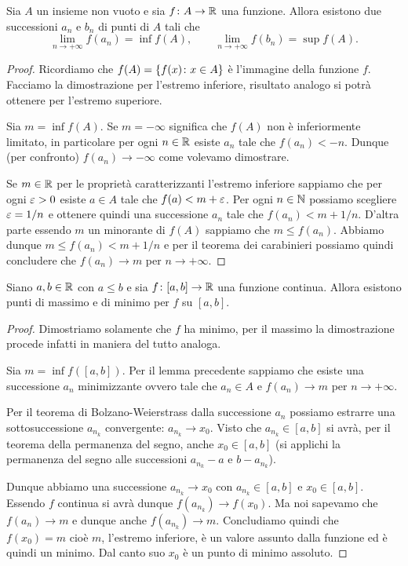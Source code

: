 \begin{lemma}
Sia $A$ un insieme non vuoto e
sia $f\colon A \to \mathbb R$ una funzione. Allora esistono
due successioni $a_n$ e $b_n$ di punti di $A$ tali che
\[
  \lim_{n\to +\infty} f(a_n) = \inf f(A), \qquad
  \lim_{n\to +\infty} f(b_n) = \sup f(A).
\]
\end{lemma}
%
\begin{proof}
Ricordiamo che $f(A) = {\left\{ f(x)\colon x \in A \right\}}$ è l'immagine
della funzione $f$. Facciamo la dimostrazione per l'estremo inferiore,
risultato analogo si potrà ottenere per l'estremo superiore.

Sia $m=\inf f(A)$.
Se $m=-\infty$ significa che $f(A)$ non è inferiormente limitato,
in particolare per ogni $n\in \mathbb R$ esiste $a_n$ tale che
$f(a_n) < - n$.
Dunque (per confronto) $f(a_n) \to -\infty$
come volevamo dimostrare.

Se $m\in \mathbb R$ per le proprietà caratterizzanti l'estremo inferiore
sappiamo che per ogni $\varepsilon>0$ esiste $a\in A$ tale che
$f(a) < m + \varepsilon$.
Per ogni $n\in\mathbb N$ possiamo scegliere $\varepsilon=1/n$ e ottenere quindi
una successione $a_n$ tale che $f(a_n) < m + 1/n$.
D'altra parte essendo $m$ un minorante di $f(A)$ sappiamo che
$m \le f(a_n)$.
Abbiamo dunque $m \le f(a_n) < m+ 1/n$ e per il teorema dei
carabinieri possiamo quindi concludere che $f(a_n) \to m$
per $n\to +\infty$.
\end{proof}

\begin{theorem}[Weierstrass]
\mymark{***}
Siano $a,b\in \mathbb R$ con $a\le b$
e sia $f\colon [a,b]\to \mathbb R$ una funzione continua.
Allora
esistono punti di massimo e di minimo per $f$ su $[a,b]$.
\end{theorem}
%
\begin{proof}
\mymark{***}
Dimostriamo solamente che $f$ ha minimo, per il massimo la dimostrazione procede
infatti in maniera del tutto analoga.

Sia $m= \inf f([a,b])$.
Per il lemma precedente sappiamo che esiste una successione $a_n$ minimizzante ovvero tale che
$a_n \in A$ e $f(a_n)\to m$ per $n\to +\infty$.

Per il teorema di Bolzano-Weierstrass dalla successione $a_n$ possiamo estrarre una sottosuccessione $a_{n_k}$ convergente: $a_{n_k} \to x_0$.
Visto che $a_{n_k} \in [a,b]$ si avrà, per il teorema della permanenza del segno, anche $x_0 \in [a,b]$ (si applichi la permanenza del segno alle successioni $a_{n_k}-a$ e $b-a_{n_k}$).

Dunque abbiamo una successione $a_{n_k}\to x_0$ con $a_{n_k}\in [a,b]$ e
$x_0 \in [a,b]$. Essendo $f$ continua si avrà dunque $f(a_{n_k}) \to f(x_0)$.
Ma noi sapevamo che $f(a_n)\to m$ e dunque anche $f(a_{n_k}) \to m$.
Concludiamo quindi che $f(x_0) = m$ cioè $m$, l'estremo inferiore,
è un valore assunto dalla funzione ed è quindi un minimo.
Dal canto suo $x_0$ è un punto di minimo assoluto.
\end{proof}


